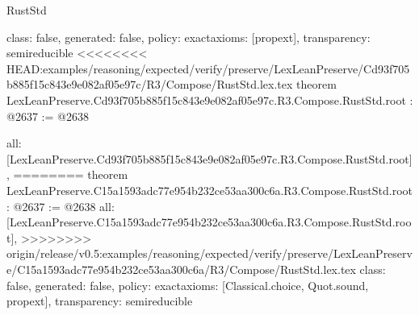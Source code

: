 \begin{lexlean}{RustStd}
\begin{coremodule}
{\begin{coremodule}
{{{{  class: false,
  generated: false,
  policy: exact{axioms: [propext]},
  transparency: semireducible
}
<<<<<<<< HEAD:examples/reasoning/expected/verify/preserve/LexLeanPreserve/Cd93f705b885f15c843e9e082af05e97c/R3/Compose/RustStd.lex.tex
theorem LexLeanPreserve.Cd93f705b885f15c843e9e082af05e97c.R3.Compose.RustStd.root : @2637 := @2638 {
  all: [LexLeanPreserve.Cd93f705b885f15c843e9e082af05e97c.R3.Compose.RustStd.root],
========
theorem LexLeanPreserve.C15a1593adc77e954b232ce53aa300c6a.R3.Compose.RustStd.root : @2637 := @2638 {
  all: [LexLeanPreserve.C15a1593adc77e954b232ce53aa300c6a.R3.Compose.RustStd.root],
>>>>>>>> origin/release/v0.5:examples/reasoning/expected/verify/preserve/LexLeanPreserve/C15a1593adc77e954b232ce53aa300c6a/R3/Compose/RustStd.lex.tex
  class: false,
  generated: false,
  policy: exact{axioms: [Classical.choice, Quot.sound, propext]},
  transparency: semireducible
}

}}}}
\end{coremodule}}
\end{coremodule}
\end{lexlean}
